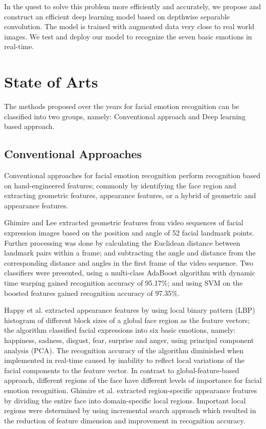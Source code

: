 \documentclass[master]{thesis-uestc}
\begin{document}
In the quest to solve this problem more efficiently and accurately, we propose and construct an efficient deep learning model based on depthwise separable convolution. The model is trained with augmented data very close to real world images. We test and deploy our model to recognize the seven basic emotions in real-time.

\section{State of Arts}
The methods proposed over the years for facial emotion recognition can be classified into two groups, namely: Conventional approach and Deep learning based approach.

\subsection{Conventional Approaches}
Conventional approaches for facial emotion recognition perform recognition based on hand-engineered features; commonly by identifying the face region and extracting geometric features, appearance features, or a hybrid of geometric and appearance features.

Ghimire and Lee\cite{ghimire2013} extracted geometric features from video sequences of facial expression images based on the position and angle of 52 facial landmark points. Further processing was done by calculating the Euclidean distance between landmark pairs within a frame; and subtracting the angle and distance from the corresponding distance and angles in the first frame of the video sequence. Two classifiers were presented, using a multi-class AdaBoost algorithm with dynamic time warping gained recognition accuracy of 95.17\%; and using SVM on the boosted features gained recognition accuracy of 97.35\%.

Happy et al.\cite{Happy-2017} extracted appearance features by using local binary pattern (LBP) histogram of different block sizes of a global face region as the feature vectors; the algorithm classified facial expressions into six basic emotions, namely: happiness, sadness, disgust, fear, surprise and anger, using principal component analysis (PCA). The recognition accuracy of the algorithm diminished when implemented in real-time caused by inability to reflect local variations of the facial components to the feature vector. In contrast to global-feature-based approach, different regions of the face have different levels of importance for facial emotion recognition\cite{josh2018}. Ghimire et al.\cite{ghimire2013} extracted region-specific appearance features by dividing the entire face into domain-specific local regions. Important local regions were determined by using incremental search approach which resulted in the reduction of feature dimension and improvement in recognition accuracy.
\end{document}
